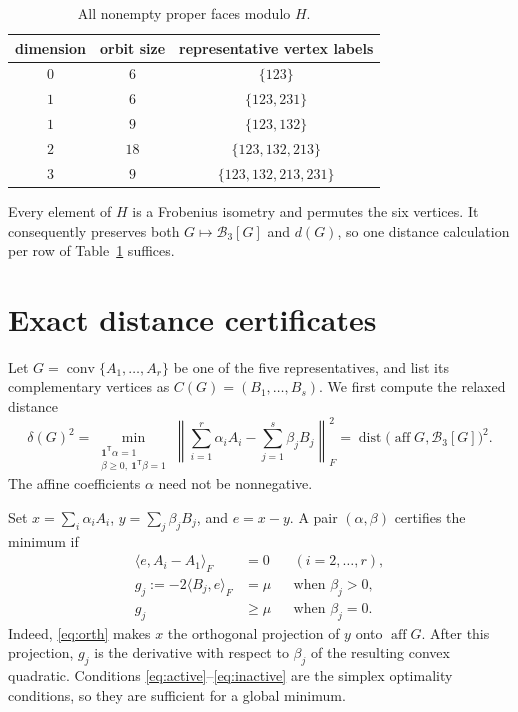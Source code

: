 \documentclass[11pt]{article}
\DeclareMathOperator{\dist}{dist}
\DeclareMathOperator{\aff}{aff}
\DeclareMathOperator{\conv}{conv}
\begin{document}
\begin{table}[ht]
\centering
\caption{All nonempty proper faces modulo $H$.}
\label{tab:orbits}
\begin{tabular}{@{}ccc@{}}
\toprule
dimension & orbit size & representative vertex labels \\
\midrule
$0$ & $6$  & $\{123\}$ \\
$1$ & $6$  & $\{123,231\}$ \\
$1$ & $9$  & $\{123,132\}$ \\
$2$ & $18$ & $\{123,132,213\}$ \\
$3$ & $9$  & $\{123,132,213,231\}$ \\
\bottomrule
\end{tabular}
\end{table}

Every element of $H$ is a Frobenius isometry and permutes the six vertices.
It consequently preserves both $G\mapsto\mathcal B_3[G]$ and $d(G)$, so one
distance calculation per row of Table~\ref{tab:orbits} suffices.

\section{Exact distance certificates}

Let $G=\conv\{A_1,\ldots,A_r\}$ be one of the five representatives, and
list its complementary vertices as $C(G)=(B_1,\ldots,B_s)$.  We first
compute the relaxed distance
\[
 \delta(G)^2=
 \min_{\substack{\mathbf1^{\mathsf T}\alpha=1\\
                   \beta\geq0,\ \mathbf1^{\mathsf T}\beta=1}}
 \left\|\sum_{i=1}^r\alpha_iA_i-
             \sum_{j=1}^s\beta_jB_j\right\|_F^2
 =\dist\bigl(\aff G,\mathcal B_3[G]\bigr)^2.
\]
The affine coefficients $\alpha$ need not be nonnegative.

Set $x=\sum_i\alpha_iA_i$, $y=\sum_j\beta_jB_j$, and $e=x-y$.  A pair
$(\alpha,\beta)$ certifies the minimum if
\begin{align}
 \langle e,A_i-A_1\rangle_F&=0 &&(i=2,\ldots,r),\label{eq:orth}\\
 g_j:=-2\langle B_j,e\rangle_F&=\mu
     &&\text{when }\beta_j>0,\label{eq:active}\\
 g_j&\geq\mu &&\text{when }\beta_j=0.\label{eq:inactive}
\end{align}
Indeed, \eqref{eq:orth} makes $x$ the orthogonal projection of $y$ onto
$\aff G$.  After this projection, $g_j$ is the derivative with respect to
$\beta_j$ of the resulting convex quadratic.  Conditions
\eqref{eq:active}--\eqref{eq:inactive} are the simplex optimality
conditions, so they are sufficient for a global minimum.
\end{document}
